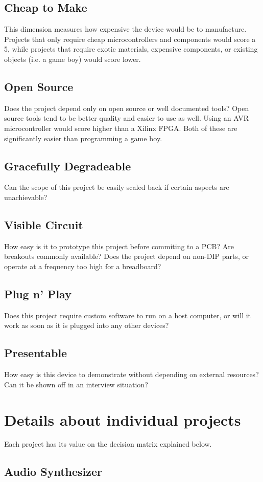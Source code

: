 \documentclass{article}
\begin{document}
\subsection{Cheap to Make}
This dimension measures how expensive the device would be to
manufacture. Projects that only require cheap microcontrollers and
components would score a 5, while projects that require exotic
materials, expensive components, or existing objects (i.e. a game boy)
would score lower. 
\subsection{Open Source}
Does the project depend only on open source or well documented tools?
Open source tools tend to be better quality and easier to use as well.
Using an AVR microcontroller would score higher than a Xilinx
FPGA. Both of these are significantly easier than programming a game
boy.
\subsection{Gracefully Degradeable}
Can the scope of this project be easily scaled back if certain aspects are
unachievable? 
\subsection{Visible Circuit}
How easy is it to prototype this project before commiting to a PCB?
Are breakouts commonly available? Does the project depend on non-DIP
parts, or operate at a frequency too high for a breadboard?
\subsection{Plug n' Play}
Does this project require custom software to run on a host computer,
or will it work as soon as it is plugged into any other devices?
\subsection{Presentable}
How easy is this device to demonstrate without depending on external
resources? Can it be shown off in an interview situation?

\section{Details about individual projects}
Each project has its value on the decision matrix explained below. 

\subsection{Audio Synthesizer}
\end{document}
